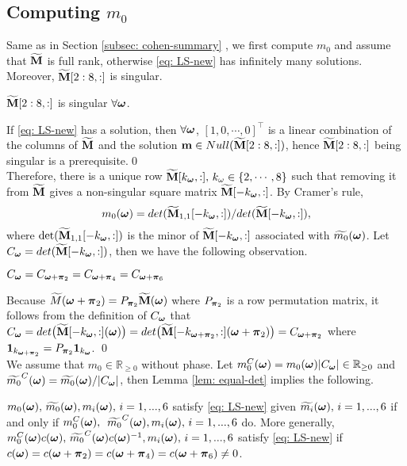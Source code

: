 \subsection{Computing $m_0$}\label{subsec: compute-m0}
Same as in Section \ref{subsec: cohen-summary} , we first compute $m_0$ and assume that $\widetilde{\mathbf{M}}$ is full rank, otherwise \eqref{eq: LS-new} has infinitely many solutions. Moreover, $\widetilde{\mathbf{M}}[2:8,:]$ is singular. 
\begin{lemma}\label{lem: subM-singular}
$\widetilde{\mathbf{M}}[2:8,:]$ is singular $\forall \boldsymbol{\omega}$.
\end{lemma}
If \eqref{eq: LS-new} has a solution, then $\forall \boldsymbol{\omega}$,  $[1,0,\cdots,0]^\top$ is a linear combination of the columns of $\widetilde{\mathbf{M}}$ and the solution $\mathbf{m} \in Null(\widetilde{\mathbf{M}}[2:8,:])$, hence $\widetilde{\mathbf{M}}[2:8,:]$ being singular is a prerequisite.\qed\\
Therefore, there is a unique row $\widetilde{\mathbf{M}}[k_{\boldsymbol{\omega}},:],\,k_\omega\in\{2,\cdots,8\}$ such that removing it from $\widetilde{\mathbf{M}}$ gives a non-singular square matrix $\widetilde{\mathbf{M}}[-k_{\boldsymbol{\omega}},:]$. By Cramer's rule, $$m_0(\boldsymbol{\omega}) = det(\widetilde{\mathbf{M}}_{1,1}[-k_{\boldsymbol{\omega}},:])/det(\widetilde{\mathbf{M}}[-k_{\boldsymbol{\omega}},:]),$$ where $\det(\widetilde{\mathbf{M}}_{1,1}[-k_{\boldsymbol{\omega}},:])$ is the minor of $\widetilde{\mathbf{M}}[-k_{\boldsymbol{\omega}},:]$ associated with $\widetilde{m_{0}}(\boldsymbol{\omega})$. 
Let $C_{\boldsymbol{\omega}} = det(\widetilde{\mathbf{M}}[-k_{\boldsymbol{\omega}},:])$, then we have the following observation.
\begin{lemma}\label{lem: equal-det}
$C_{\boldsymbol{\omega}} = C_{\boldsymbol{\omega}+\boldsymbol{\pi}_2} = C_{\boldsymbol{\omega}+\boldsymbol{\pi}_4} = C_{\boldsymbol{\omega}+\boldsymbol{\pi}_6}$
\end{lemma}
Because $\widetilde{M}(\boldsymbol{\omega}+\boldsymbol{\pi}_2) = P_{\boldsymbol{\pi}_2}\widetilde{\mathbf{M}}(\boldsymbol{\omega})$ where $P_{\boldsymbol{\pi}_2}$ is a row permutation matrix, it follows from the definition of $C_{\boldsymbol{\omega}}$ that 
$C_{\boldsymbol{\omega}} = det\big(\widetilde{\mathbf{M}}[-k_{\boldsymbol{\omega}},:](\boldsymbol{\omega})\big) = det\big(\widetilde{\mathbf{M}}[-k_{\boldsymbol{\omega}+\boldsymbol{\pi}_2},:](\boldsymbol{\omega}+\boldsymbol{\pi}_2) \big)= C_{\boldsymbol{\omega}+\boldsymbol{\pi}_2}$ where 
$\mathbf{1}_{k_{\boldsymbol{\omega}+\boldsymbol{\pi}_2}} = P_{\boldsymbol{\pi}_2}\mathbf{1}_{k_{\boldsymbol{\omega}}}$.
\qed\\[1em]
We assume that $m_0\in\mathbb{R}_{\geq 0}$ without phase. Let $m_0^C(\boldsymbol{\omega}) = m_0(\boldsymbol{\omega})|C_{\boldsymbol{\omega}}|\in \mathbb{R}_{\geq 0}$ and $\widetilde{m_{0}}^C(\boldsymbol{\omega}) = \widetilde{m_{0}}(\boldsymbol{\omega})/|C_{\boldsymbol{\omega}}|$, then Lemma \ref{lem: equal-det} implies the following.
\begin{proposition}\label{prop: mc}
$m_0(\boldsymbol{\omega}),\,\widetilde{m_{0}}(\boldsymbol{\omega}), m_i(\boldsymbol{\omega}),\,  i = 1,...,6$ satisfy \eqref{eq: LS-new} given $\widetilde{m_{i}}(\boldsymbol{\omega}),\,i=1,...,6$ if and only if $m_0^C(\boldsymbol{\omega}),$ $\,\widetilde{m_{0}}^C(\boldsymbol{\omega}), m_i(\boldsymbol{\omega}),\,i = 1,...,6$ do. More generally, $m_0^C(\boldsymbol{\omega})c(\boldsymbol{\omega}),\,\widetilde{m_{0}}^C(\boldsymbol{\omega})c(\boldsymbol{\omega})^{-1}, m_i(\boldsymbol{\omega}),\,i=1,...,6$ satisfy \eqref{eq: LS-new} if $c(\boldsymbol{\omega}) = c(\boldsymbol{\omega}+\boldsymbol{\pi}_2)=c(\boldsymbol{\omega}+\boldsymbol{\pi}_4) = c(\boldsymbol{\omega}+\boldsymbol{\pi}_6) \neq 0$.
\end{proposition}

